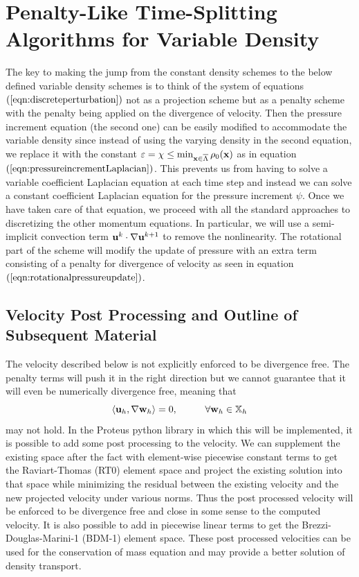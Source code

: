 \documentclass[letterpaper]{erdc}
\begin{document}
%
%
%
\section{Penalty-Like Time-Splitting Algorithms for Variable Density}\label{sec:variabledensityAlgorithm}

The key to making the jump from the constant density schemes to the below
defined variable density schemes is to think of the system of
equations~$\left(\ref{eqn:discreteperturbation}\right)$ not as a projection
scheme but as a penalty scheme with the penalty being applied on the divergence
of velocity.  Then the pressure increment equation (the second one) can be
easily modified to accommodate the variable density since instead of using the
varying density in the second equation, we replace it with the constant
$\varepsilon = \chi \leq \min_{\textbf{x}\in\overline{\Lambda}}\rho_0(\textbf{x})$ as in
equation~$\left(\ref{eqn:pressureincrementLaplacian}\right)$.  This prevents us
from having to solve a variable coefficient Laplacian equation at each time
step and instead we can solve a constant coefficient Laplacian equation for the
pressure increment $\psi$.  Once we have taken care of that equation, we
proceed with all the standard approaches to discretizing the other momentum
equations.  In particular, we will use a semi-implicit convection term
$\textbf{u}^{k}\cdot\nabla\textbf{u}^{k+1}$ to remove the nonlinearity.  The rotational part
of the scheme will modify the update of pressure with an extra term consisting
of a penalty for divergence of velocity as seen in
equation~$\left(\ref{eqn:rotationalpressureupdate}\right)$.

\subsection{Velocity Post Processing and Outline of Subsequent Material}

The velocity described below is not explicitly enforced to be divergence free.
The penalty terms will push it in the right direction but we cannot guarantee
that it will even be numerically divergence free, meaning that
\begin{equation}
  \left\langle \textbf{u}_h, \nabla\textbf{w}_h \right\rangle = 0, \hspace{1cm}\forall\textbf{w}_h\in\mathbb{X}_h
\end{equation}
may not hold.  In the Proteus python library in which this will be implemented,
it is possible to add some post processing to the velocity.  We can supplement
the existing space after the fact with element-wise piecewise constant terms to
get the Raviart-Thomas (RT0) element space and project the existing solution
into that space while minimizing the residual between the existing velocity and
the new projected velocity under various norms.  Thus the post processed
velocity will be enforced to be divergence free and close in some sense to the
computed velocity.  It is also possible to add in piecewise linear terms to get
the Brezzi-Douglas-Marini-1 (BDM-1) element space.  These post processed
velocities can be used for the conservation of mass equation and may provide a
better solution of density transport.
\end{document}
